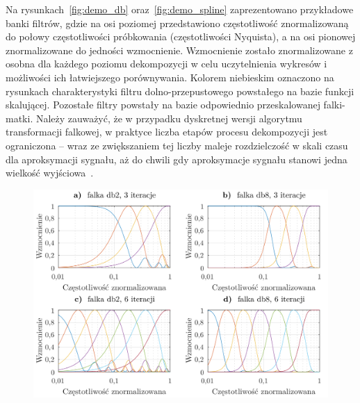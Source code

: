 Na rysunkach~\ref{fig:demo_db} oraz~\ref{fig:demo_spline} zaprezentowano przykładowe banki filtrów, gdzie na osi poziomej przedstawiono częstotliwość znormalizowaną do połowy częstotliwości próbkowania (częstotliwości Nyquista), a na osi pionowej znormalizowane do jedności wzmocnienie. Wzmocnienie zostało znormalizowane z osobna dla każdego poziomu dekompozycji w celu uczytelnienia wykresów i możliwości ich łatwiejszego porównywania. Kolorem niebieskim oznaczono na rysunkach charakterystyki filtru dolno-przepustowego powstałego na bazie funkcji skalującej. Pozostałe filtry powstały na bazie odpowiednio przeskalowanej falki-matki. Należy zauważyć, że w przypadku dyskretnej wersji algorytmu transformacji falkowej, w praktyce liczba etapów procesu dekompozycji jest ograniczona -- wraz ze zwiększaniem tej liczby maleje rozdzielczość w skali czasu dla aproksymacji sygnału, aż do chwili gdy aproksymacje sygnału stanowi jedna wielkość wyjściowa~\cite{wallen_handbook}.

\begin{figure}[htb!]
\begin{center}
\includegraphics{obrazki/bank_db_demo}
\end{center}
\end{figure}

